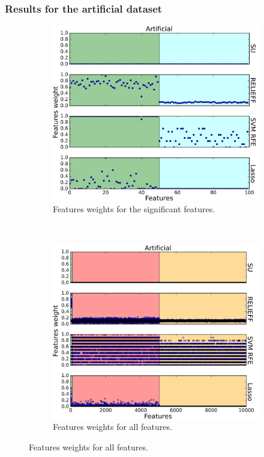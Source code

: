 \documentclass[twoside,11pt]{article}
\begin{document}
\subsubsection{Results for the artificial dataset}
\begin{figure}
  \centering 
  \begin{subfigure}[b]{0.48\textwidth}
      \includegraphics[width=\textwidth]{feature_weights_plot_artificial_only_features.png}
      \caption{Features weights for the significant features.}
      \label{fig:feature_weights_plot_artificial_only_features}
  \end{subfigure}
  ~
  \begin{subfigure}[b]{0.48\textwidth}
    \includegraphics[width=\textwidth]{feature_weights_plot_artificial_all.png}
      \caption{Features weights for all features.}
      \label{fig:feature_weights_plot_artificial_all}
  \end{subfigure}


\end{figure}
\end{document}
